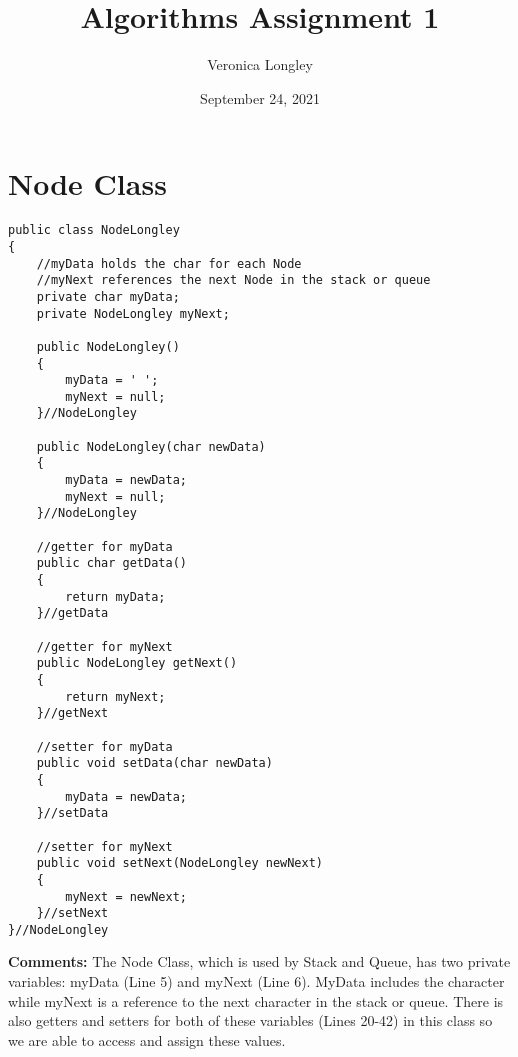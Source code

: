 \documentclass{article}
\title{\textbf{Algorithms Assignment 1}}
\author{Veronica Longley }
\date{September 24, 2021}
\begin{document}
\lstset{numbers= left}
\lstset{language=Java}
\huge
\maketitle{}

\small
\pagebreak
\section{Node Class}
\begin{lstlisting}[frame =single,
backgroundcolor = \color{grey!12}]
public class NodeLongley
{
	//myData holds the char for each Node
	//myNext references the next Node in the stack or queue
	private char myData;
	private NodeLongley myNext;

	public NodeLongley()
	{
		myData = ' ';
		myNext = null;
	}//NodeLongley
	
	public NodeLongley(char newData)
	{
		myData = newData;
		myNext = null;
	}//NodeLongley

	//getter for myData 
	public char getData()
	{
		return myData;
	}//getData
	
	//getter for myNext
	public NodeLongley getNext()
	{
		return myNext;
	}//getNext
	
	//setter for myData 
	public void setData(char newData)
	{
		myData = newData;
	}//setData
	
	//setter for myNext
	public void setNext(NodeLongley newNext)
	{
		myNext = newNext;
	}//setNext
}//NodeLongley
\end{lstlisting}
\textbf{Comments:}
The Node Class, which is used by Stack and Queue, has two private variables: myData (Line 5) and myNext (Line 6). MyData includes the character while myNext is a reference to the next character in the stack or queue. There is also getters and setters for both of these variables (Lines 20-42) in this class so we are able to access and assign these values. 


\pagebreak
\end{document}
